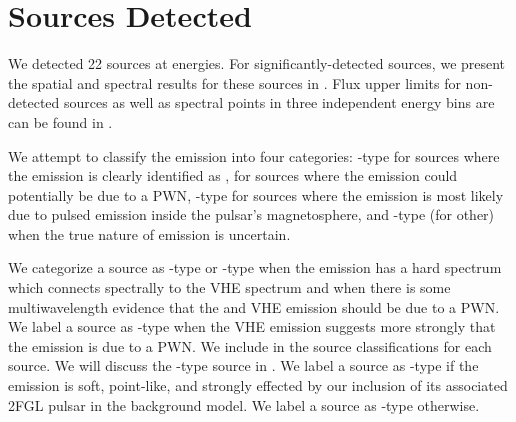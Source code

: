 \section{Sources Detected} 



We detected 22 sources at \gev energies.  For significantly-detected
sources, we present the spatial and spectral results for these sources
in .  Flux upper limits for non-detected
sources as well as spectral points in three independent energy bins are
can be found in \cite{acero_2013a_constraints-galactic}.

We attempt to classify the \gev emission into four categories:
\PWNClass-type for sources where the \gev emission is clearly identified
as , \PWNcClass for sources where the \gev emission could potentially
be due to a \ac{PWN}, \PSRClass-type for sources where the emission is
most likely due to pulsed emission inside the pulsar's magnetosphere,
and \OtherClass-type (for other) when the true nature of emission is
uncertain.

We categorize a source as \PWNClass-type or \PWNcClass-type when the
emission has a hard spectrum which connects spectrally to the \ac{VHE}
spectrum and when there is some multiwavelength evidence that the
\gev and \ac{VHE} emission should be due to a \ac{PWN}.  We label
a source as \PWNClass-type when the \ac{VHE} emission suggests
more strongly that the emission is due to a \ac{PWN}.  We include
in  the source classifications
for each source.  We will discuss the \PWNClass-type source
in .  We label a source
as \PSRClass-type if the emission is soft, point-like, and strongly
effected by our inclusion of its associated \ac{2FGL} pulsar in the
background model.  We label a source as \OtherClass-type otherwise.




